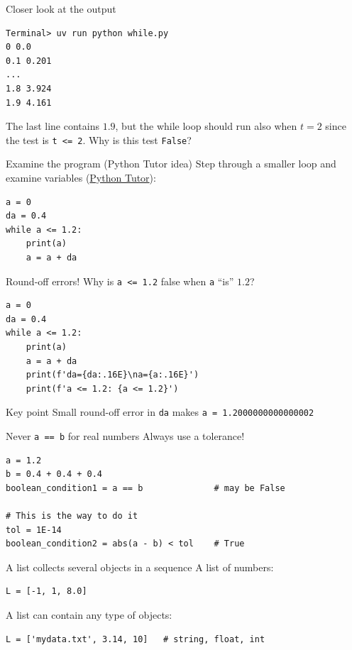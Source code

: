 \begin{frame}[fragile]{Closer look at the output}
\begin{lstlisting}[style=terminal]
Terminal> uv run python while.py
0 0.0
0.1 0.201
...
1.8 3.924
1.9 4.161
\end{lstlisting}
  The last line contains $1.9$, but the while loop should run also when
  $t=2$ since the test is \texttt{t <= 2}. Why is this test \texttt{False}?
\end{frame}

\begin{frame}[fragile]{Examine the program (Python Tutor idea)}
  Step through a smaller loop and examine variables
  (\href{https://pythontutor.com/visualize.html\#mode=edit}{Python Tutor}):
\begin{lstlisting}[style=pythoncompact]
a = 0
da = 0.4
while a <= 1.2:
    print(a)
    a = a + da
\end{lstlisting}
\end{frame}

\begin{frame}[fragile]{Round-off errors!}
  Why is \texttt{a <= 1.2} false when \texttt{a} ``is'' $1.2$?
\begin{lstlisting}[style=pythoncompact]
a = 0
da = 0.4
while a <= 1.2:
    print(a)
    a = a + da
    print(f'da={da:.16E}\na={a:.16E}')
    print(f'a <= 1.2: {a <= 1.2}')
\end{lstlisting}
  \begin{alertblock}{Key point}
    Small round-off error in \texttt{da} makes
    \texttt{a = 1.2000000000000002}
  \end{alertblock}
\end{frame}

\begin{frame}[fragile]{Never \texttt{a == b} for real numbers}
  Always use a tolerance!
\begin{lstlisting}[style=pythoncompact]
a = 1.2
b = 0.4 + 0.4 + 0.4
boolean_condition1 = a == b              # may be False

# This is the way to do it
tol = 1E-14
boolean_condition2 = abs(a - b) < tol    # True
\end{lstlisting}
\end{frame}

\begin{frame}[fragile]{A list collects several objects in a sequence}
  A list of numbers:
\begin{lstlisting}[style=pythoncompact]
L = [-1, 1, 8.0]
\end{lstlisting}
  A list can contain any type of objects:
\begin{lstlisting}[style=pythoncompact]
L = ['mydata.txt', 3.14, 10]   # string, float, int
\end{lstlisting}
\end{frame}

